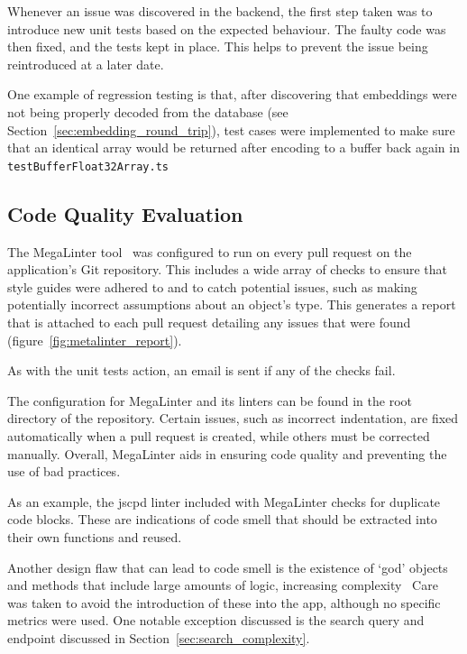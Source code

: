 Whenever an issue was discovered in the backend, the first step taken was to
introduce new unit tests based on the expected behaviour. The faulty code was
then fixed, and the tests kept in place. This helps to prevent the issue being
reintroduced at a later date.

One example of regression testing is that, after discovering that embeddings were
not being properly decoded from the database (see Section~\ref{sec:embedding_round_trip}),
test cases were implemented to make sure that an identical array would be returned
after encoding to a buffer back again in \texttt{testBufferFloat32Array.ts}

\subsection{Code Quality Evaluation}
The MegaLinter tool~\cite{vuillamy_megalinter_nodate} was configured to run on every pull request on the application's Git repository. This includes a wide array
of checks to ensure that style guides were adhered to and to catch potential issues, such as making potentially incorrect
assumptions about an object's type. This generates a report that is attached to each pull request detailing
any issues that were found (figure~\ref{fig:metalinter_report}).

As with the unit tests action, an email is sent if any of the checks fail.

The configuration for MegaLinter and its linters can be found in the root directory of the repository.
Certain issues, such as incorrect indentation, are fixed automatically when a pull request is created, while others
must be corrected manually. Overall, MegaLinter aids in ensuring code quality and preventing the use of bad practices.

As an example, the jscpd linter included with MegaLinter checks for duplicate code blocks. These are indications of code
smell that should be extracted into their own functions and reused.~\cite{fowler_refactoring_1997}

Another design flaw that can lead to code smell is the existence of \enquote*{god} objects
and methods that include large amounts of logic, increasing complexity~\cite{marinescu_measurement_2005,vaucher_tracking_2009}
Care was taken to avoid the introduction of these into the \chef{} app, although no specific
metrics were used. One notable exception discussed is the search query and endpoint discussed in
Section~\ref{sec:search_complexity}.

